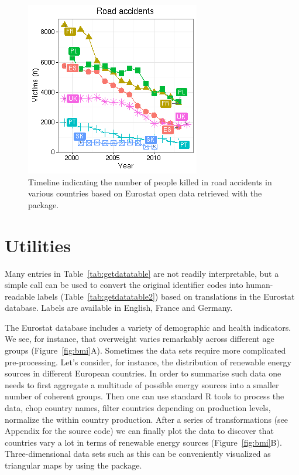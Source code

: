 \begin{figure}[h]
\begin{center}
\includegraphics{2015-manu-roadacc-1}
\end{center}
\caption{Timeline indicating the number of people killed in road accidents in various countries based on Eurostat open data retrieved with the  package.}
\label{fig:transport}
\end{figure}




\section{Utilities}

Many entries in Table~\ref{tab:getdatatable} are not readily
interpretable, but a simple call  can be
used to convert the original identifier codes into human-readable
labels (Table~\ref{tab:getdatatable2}) based on translations
in the Eurostat database. Labels are available in English, France and
Germany.

The Eurostat database includes a variety of demographic and health
indicators. We see, for instance, that overweight varies remarkably
across different age groups (Figure~\ref{fig:bmi}A). Sometimes the
data sets require more complicated pre-processing. Let's consider, for
instance, the distribution of renewable energy sources in different
European countries. In order to summarise such data one needs to first
aggregate a multitude of possible energy sources into a smaller number
of coherent groups. Then one can use standard R tools to process the
data, chop country names, filter countries depending on production
levels, normalize the within country production. After a series of
transformations (see Appendix for the source code) we can finally plot
the data to discover that countries vary a lot in terms of renewable
energy sources (Figure~\ref{fig:bmi}B). Three-dimensional data sets
such as this can be conveniently visualized as triangular maps by
using the  \citep{plotrix} package.

